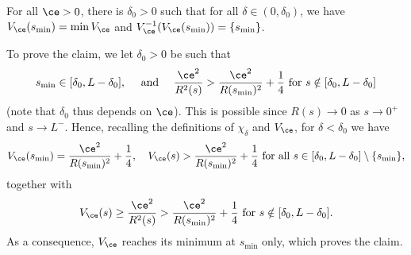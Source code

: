 \begin{claim}
For all $\ce>0$, there is $\delta_0>0$ such that for all $\delta \in (0,\delta_0)$, we have $V_\ce(s_{\min})= \min V_\ce$ and $V_\ce^{-1}(V_\ce(s_{\min})) = \{ s_{\min}\}$.
\end{claim}

To prove the claim, we let $\delta_0>0$ be such that
\[
s_{\min} \in [\delta_0, L-\delta_0], \quad \text{ and }
\quad \frac{\ce^2}{R^2(s)} > \frac{\ce^2}{R(s_{\min})^2} +\frac14 \text{ for } s \notin [\delta_0, L-\delta_0]
\]
(note that $\delta_0$ thus depends on $\ce$).
This is possible since $R(s)\to 0$ as $s\to 0^+$ and $s\to L^-$.
Hence, recalling the definitions of $\chi_\delta$ and $V_\ce$, for $\delta < \delta_0$ we have
\[
V_\ce(s_{\min})= \frac{\ce^2}{R(s_{\min})^2} + \frac14, \quad V_\ce(s) > \frac{\ce^2}{R(s_{\min})^2} + \frac14 \text{ for all }s \in [\delta_0, L-\delta_0] \setminus \{s_{\min}\},
\]
together with
\[
V_\ce(s) \geq \frac{\ce^2}{R^2(s)} > \frac{\ce^2}{R(s_{\min})^2} + \frac14 \text{ for }s \notin [\delta_0, L-\delta_0].
\]
As a consequence, $V_\ce$ reaches its minimum at $s_{\min}$ only, which proves the claim.

